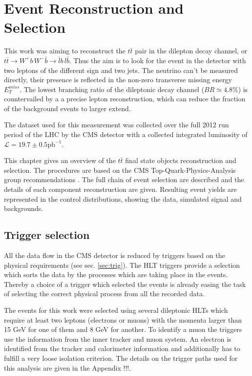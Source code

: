 \chapter{Event Reconstruction and Selection}\label{chapt:event_selection}
 
This work was aiming to reconstruct the $t\bar{t}$ pair in the dilepton decay channel, or
$t\bar{t} \to W^{+}b\,W^{-}\bar{b} \to \bar{l}b\,l\bar{b}$. Thus the aim is to 
look for the event in the detector with two leptons of the different sign and two jets. The 
neutrino can't be measured directly, their presence is reflected in the non-zero transverse
missing energy $E_{T}^{miss}$. The lowest branching ratio of the dileptonic decay channel
($BR \simeq 4.8\%$) is countervailed by a a precise lepton reconstruction, which can reduce
the fraction of the background events to larger extend.

The dataset used for this measurement was collected over the full 2012 run period of the LHC
by the CMS detector with a collected integrated luminosity of $\mathcal{L} = 19.7 \pm 0.5 \textrm{pb}^{-1}$.

This chapter gives an overview of the $t\bar{t}$ final state objects reconstruction and selection. The 
procedures are based on the CMS Top-Quark-Physics-Analysis group recommendations \cite{TopPAGreco}.
The full chain of event selection are described and the details of each component reconstruction are given. 
Resulting event yields are represented in the control distributions, showing the data, simulated signal and backgrounds.

\section{Trigger selection}

All the data flow in the CMS detector is reduced by triggers based on the physical requirements (see sec. \ref{sec:trig}).
The HLT triggers provide a selection which sorts the data by the processes which are taking place in the events. Thereby
a choice of a trigger which selected the events is already easing the task of selecting the correct physical process from
all the recorded data.

The events for this work were selected using several dileptonic HLTs which require at least two leptons (electrons or muons)
with the momenta larger than 15 GeV for one of them and 8 GeV for another. To identify a muon the triggers use the information
from the inner tracker and muon system. An electron is identified from the tracker and calorimeter information and additionally
has to fulfill a very loose isolation criterion. The details on the trigger paths used for this analysis are given in the
Appendix !!!.

